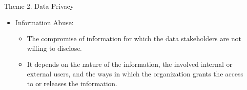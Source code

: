 \documentclass[
 size=14pt,
 paper=smartboard,  %
 mode=present, 		%
 display=slides, 	%
 pauseslide,
 fleqn,leqno]{powerdot}{}
\begin{document}
\begin{slide}{Theme 2. Data Privacy}
\begin{itemize}
\item
Information Abuse:


\begin{itemize}
\item
The compromise of information
for which the data stakeholders are not willing to disclose.

\item
It depends on the nature of the information,
the involved internal or external users,
and the ways in which the organization grants the access to
or releases the information.

\end{itemize}
\end{itemize}

\end{slide}


\end{document}
